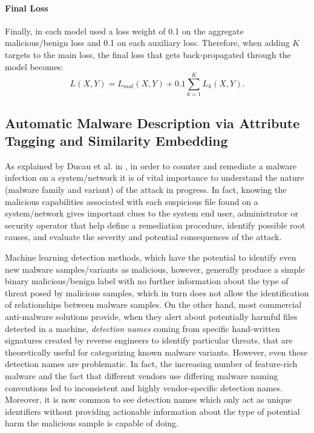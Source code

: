 \documentclass[pdfa%
,cucitura%
]{toptesi}
\begin{document}
\paragraph{Final Loss}
Finally, in \cite{ruddALOHA} each model used a loss weight of 0.1 on the aggregate malicious/benign loss and 0.1 on each auxiliary loss. Therefore, when adding $K$ targets to the main loss, the final loss that gets back-propagated through the model becomes:
\begin{equation} \label{eq:alohaFinalLoss}
	L(X,Y) = L_{mal}(X,Y) + 0.1 \sum_{k=1}^{K} L_k(X,Y).
\end{equation}

\subsection{Automatic Malware Description via Attribute Tagging and Similarity Embedding}
As explained by Ducau et al. in \cite{DucauAMDATSE}, in order to counter and remediate a malware infection on a system/network it is of vital importance to understand the nature (malware family and variant) of the attack in progress. In fact, knowing the malicious capabilities associated with each suspicious file found on a system/network gives important clues to the system end user, administrator or security operator that help define a remediation procedure, identify possible root causes, and evaluate the severity and potential consequences of the attack. 

Machine learning detection methods, which have the potential to identify even new malware samples/variants as malicious, however, generally produce a simple binary malicious/benign label with no further information about the type of threat posed by malicious samples, which in turn does not allow the identification of relationships between malware samples. On the other hand, most commercial anti-malware solutions provide,  when they alert about potentially harmful files detected in a machine, \textit{detection names} coming from specific hand-written signatures created by reverse engineers to identify particular threats, that are theoretically useful for categorizing known malware variants. However, even these detection names are problematic. In fact, the increasing number of feature-rich malware and the fact that different vendors use differing malware naming conventions led to inconsistent and highly vendor-specific detection names. Moreover, it is now common to see detection names which only act as unique identifiers without providing actionable information about the type of potential harm the malicious sample is capable of doing.
\end{document}
